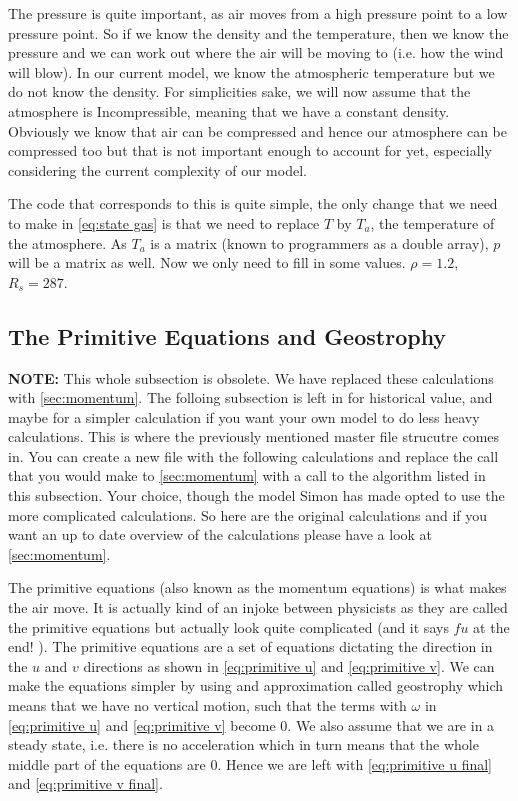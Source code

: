 The pressure is quite important, as air moves from a high pressure point to a low pressure point. So if we know the density and the temperature, then we know the pressure and we can work out 
where the air will be moving to (i.e. how the wind will blow). In our current model, we know the atmospheric temperature but we do not know the density. For simplicities sake, we will now assume
that the atmosphere is Incompressible, meaning that we have a constant density. Obviously we know that air can be compressed and hence our atmosphere can be compressed too but that is not 
important enough to account for yet, especially considering the current complexity of our model.

The code that corresponds to this is quite simple, the only change that we need to make in \autoref{eq:state gas} is that we need to replace $T$ by $T_a$, the temperature of the atmosphere. As
$T_a$ is a matrix (known to programmers as a double array), $p$ will be a matrix as well. Now we only need to fill in some values. $\rho = 1.2$\cite{densityAir}, $R_s = 287$\cite{specificGasConstantAir}.

\subsection{The Primitive Equations and Geostrophy}
\textbf{NOTE:} This whole subsection is obsolete. We have replaced these calculations with \autoref{sec:momentum}. The folloing subsection is left in for historical value, and maybe for a simpler
calculation if you want your own model to do less heavy calculations. This is where the previously mentioned master file strucutre comes in. You can create a new file with the following 
calculations and replace the call that you would make to \autoref{sec:momentum} with a call to the algorithm listed in this subsection. Your choice, though the model Simon has made opted to use 
the more complicated calculations. So here are the original calculations and if you want an up to date overview of the calculations please have a look at \autoref{sec:momentum}.

The primitive equations (also known as the momentum equations) is what makes the air move. It is actually kind of an injoke between physicists as they are called the primitive equations but 
actually look quite complicated (and it says $fu$ at the end! \cite{simon}). The primitive equations are a set of equations dictating the direction in the $u$ and $v$ directions as shown in 
\autoref{eq:primitive u} and \autoref{eq:primitive v}. We can make the equations simpler by using and approximation called geostrophy which means that we have no vertical motion, such that the
terms with $\omega$ in \autoref{eq:primitive u} and \autoref{eq:primitive v} become 0. We also assume that we are in a steady state, i.e. there is no acceleration which in turn means that the 
whole middle part of the equations are $0$. Hence we are left with \autoref{eq:primitive u final} and \autoref{eq:primitive v final}.

